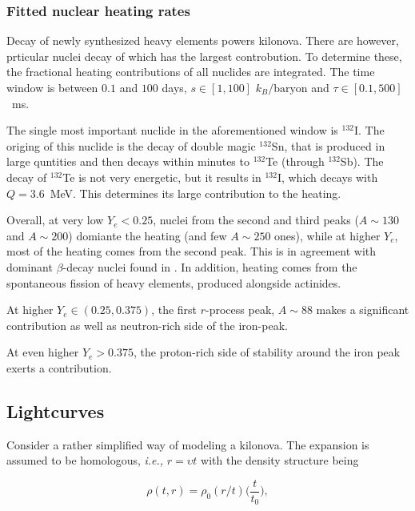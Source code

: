 \documentclass[11pt,a4paper,headinclude=true,DIV=14,BCOR=8mm,chapterprefix,listof=totoc,twoside,openright,abstracton]{scrbook}
\begin{document}

\subsubsection{Fitted nuclear heating rates}

Decay of newly synthesized heavy elements powers kilonova. There are however, prticular nuclei decay of which has the largest controbution. To determine these, the fractional heating contributions of all nuclides are integrated. The time window is between $0.1$ and $100$ days, $s\in[1,100]$ $k_B/\text{baryon}$ and $\tau\in[0.1,500]$~ms. 

The single most important nuclide in the aforementioned window is $^{132}$I. The origing of this nuclide is the decay of double magic $^{132}$Sn, that is produced in large quntities and then decays within minutes to $^{132}$Te (through $^{132}$Sb). The decay of $^{132}$Te is not very energetic, but it results in $^{132}$I, which decays with $Q=3.6$~MeV. This determines its large contribution to the heating. 

Overall, at very low $Y_e < 0.25$, nuclei from the second and third peaks ($A\sim 130$ and $A\sim 200$) domiante the heating (and few $A\sim 250$ ones), while at higher $Y_e$, most of the heating comes from the second peak. This is in agreement with dominant $\beta$-decay nuclei found in \cite{Metzger et al., 2010}. In addition, heating comes from the spontaneous fission of heavy elements, produced alongside actinides.

At higher $Y_e\in(0.25,0.375)$, the first $r$-process peak, $A\sim 88$ makes a significant contribution as well as neutron-rich side of the iron-peak. 

At even higher $Y_e>0.375$, the proton-rich side of stability around the iron peak exerts a contribution.


\subsection{Lightcurves}

Consider a rather simplified way of modeling a kilonova. 
The expansion is assumed to be homologous, \textit{i.e.,} $r = \upsilon t$ with the density structure being

\begin{equation}
    \rho(t, r) = \rho_0(r/t)\Big(\frac{t}{t_0}\Big),
\end{equation}
\end{document}

